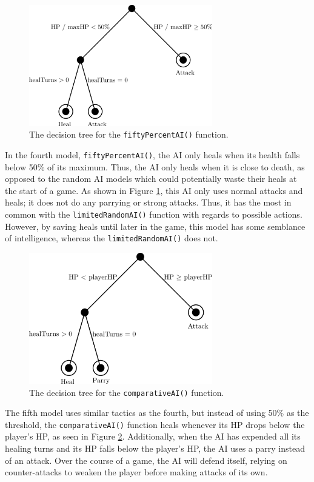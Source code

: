 \begin{figure}[H]
  \centering
  \includegraphics[width=8cm]{figures/AI50Percent.png}
  \caption{The decision tree for the \texttt{fiftyPercentAI()} function.}
  \label{fig:AI4}
\end{figure}

In the fourth model, \texttt{fiftyPercentAI()}, the AI only heals when its health falls below 50\% of its maximum. Thus, the AI only heals when it is close to death, as opposed to the random AI models which could potentially waste their heals at the start of a game. As shown in Figure \ref{fig:AI4}, this AI only uses normal attacks and heals; it does not do any parrying or strong attacks. Thus, it has the most in common with the \texttt{limitedRandomAI()} function with regards to possible actions. However, by saving heals until later in the game, this model has some semblance of intelligence, whereas the \texttt{limitedRandomAI()} does not.

\begin{figure}[H]
  \centering
  \includegraphics[width=8cm]{figures/AIComparative.png}
  \caption{The decision tree for the \texttt{comparativeAI()} function.}
  \label{fig:AI5}
\end{figure}

The fifth model uses similar tactics as the fourth, but instead of using 50\% as the threshold, the \texttt{comparativeAI()} function heals whenever its HP drops below the player's HP, as seen in Figure \ref{fig:AI5}. Additionally, when the AI has expended all its healing turns and its HP falls below the player's HP, the AI uses a parry instead of an attack. Over the course of a game, the AI will defend itself, relying on counter-attacks to weaken the player before making attacks of its own.


